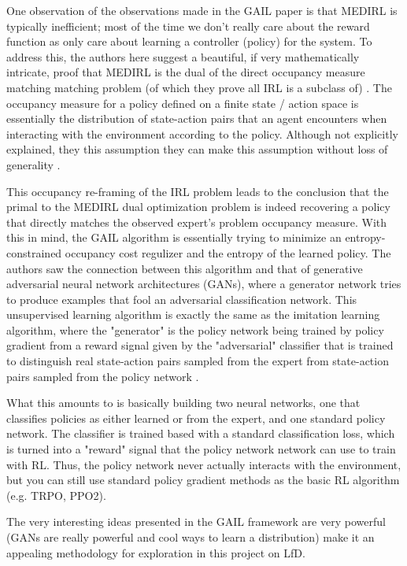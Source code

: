 One observation of the observations made in the GAIL paper is that MEDIRL is typically inefficient; most of the time we don't really care about the reward function as only care about learning a controller (policy) for the system. To address this, the authors here suggest a beautiful, if very mathematically intricate, proof that MEDIRL is the dual of the direct occupancy measure matching matching problem (of which they prove all IRL is a subclass of) \cite{Ho2016GenerativeAI}. The occupancy measure for a policy defined on a finite state / action space is essentially the distribution of state-action pairs that an agent encounters when interacting with the environment according to the policy. Although not explicitly explained, they this assumption they can make this assumption without loss of generality \cite{Ho2016GenerativeAI}.

This occupancy re-framing of the IRL problem leads to the conclusion that the primal to the MEDIRL dual optimization problem is indeed recovering a policy that directly matches the observed expert's problem occupancy measure. With this in mind, the GAIL algorithm is essentially trying to minimize an entropy-constrained occupancy cost regulizer and the entropy of the learned policy. The authors saw the connection between this algorithm and that of generative adversarial neural network architectures (GANs), where a generator network tries to produce examples that fool an adversarial classification network. This unsupervised learning algorithm is exactly the same as the imitation learning algorithm, where the "generator" is the policy network being trained by policy gradient from a reward signal given by the "adversarial" classifier that is trained to distinguish real state-action pairs sampled from the expert from state-action pairs sampled from the policy network \cite{Ho2016GenerativeAI}.

What this amounts to is basically building two neural networks, one that classifies policies as either learned or from the expert, and one standard policy network. The classifier is trained based with a standard classification loss, which is turned into a "reward" signal that the policy network network can use to train with RL. Thus, the policy network never actually interacts with the environment, but you can still use standard policy gradient methods as the basic RL algorithm (e.g. TRPO, PPO2). 

The very interesting ideas presented in the GAIL framework are very powerful (GANs are really powerful and cool ways to learn a distribution) make it an appealing methodology for exploration in this project on LfD.